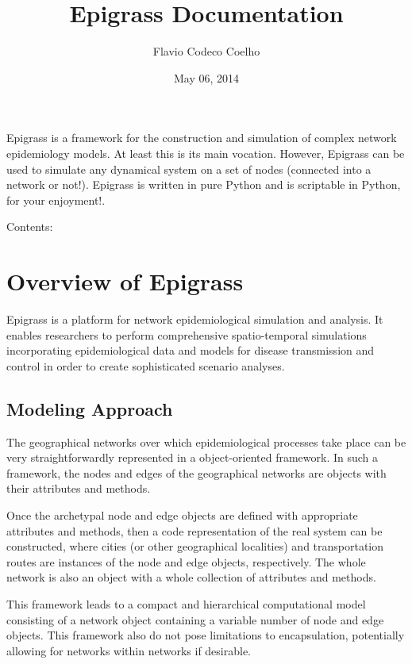 \documentclass[a4paper,10pt,english]{sphinxmanual}
\title{Epigrass Documentation}
\date{May 06, 2014}
\author{Flavio Codeco Coelho}
\begin{document}
\maketitle
\tableofcontents
{}\label{index::doc}


Epigrass is a framework for the construction and simulation of complex network epidemiology models. At least this is its main vocation. However, Epigrass can be used to simulate any dynamical system on a set of nodes (connected into a network or not!). Epigrass is written in pure Python and is scriptable in Python, for your enjoyment!.

Contents:


\chapter{Overview of Epigrass}
\label{overview:overview-of-epigrass}\label{overview::doc}\label{overview:welcome-to-epigrass-s-documentation}
Epigrass is a platform for network epidemiological simulation and analysis. It enables researchers to perform comprehensive spatio-temporal simulations incorporating epidemiological data and models for disease transmission and control in order to create sophisticated scenario analyses.


\section{Modeling Approach}
\label{overview:modeling-approach}
The geographical networks  over which epidemiological processes take place can be very straightforwardly represented in a object-oriented framework. In such a framework, the nodes and edges of the geographical networks are objects with their attributes and methods.

Once the archetypal node and edge objects are defined with appropriate attributes and methods, then a code representation of the real system can be constructed, where cities (or other geographical localities) and transportation routes are instances of the node and edge objects, respectively. The whole network is also an object with a whole collection of attributes and methods.

This framework leads to a compact and hierarchical computational model consisting of a network object containing a variable number of node and edge objects. This framework also do not pose limitations to encapsulation, potentially allowing for networks within networks if desirable.
\end{document}
